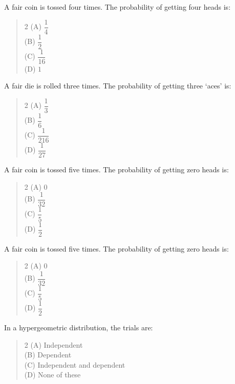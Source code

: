 \documentclass[11pt,a4paper]{article}
\begin{document}
\begin{mcqlist}
\item A fair coin is tossed four times. The probability of getting four heads is:
\begin{quote}\begin{multicols}{2}
\noindent (A) $\dfrac{1}{4}$ \\
(B) $\dfrac{1}{2}$ \\
(C) $\dfrac{1}{16}$ \\
(D) $1$
\end{multicols}\end{quote}

\item A fair die is rolled three times. The probability of getting three `aces' is:
\begin{quote}\begin{multicols}{2}
\noindent (A) $\dfrac{1}{3}$ \\
(B) $\dfrac{1}{6}$ \\
(C) $\dfrac{1}{216}$ \\
(D) $\dfrac{1}{27}$
\end{multicols}\end{quote}

\item A fair coin is tossed five times. The probability of getting zero heads is:
\begin{quote}\begin{multicols}{2}
\noindent (A) $0$ \\
(B) $\dfrac{1}{32}$ \\
(C) $\dfrac{1}{5}$ \\
(D) $\dfrac{1}{2}$
\end{multicols}\end{quote}

\item A fair coin is tossed five times. The probability of getting zero heads is:
\begin{quote}\begin{multicols}{2}
\noindent (A) $0$ \\
(B) $\dfrac{1}{32}$ \\
(C) $\dfrac{1}{5}$ \\
(D) $\dfrac{1}{2}$
\end{multicols}\end{quote}

\item In a hypergeometric distribution, the trials are:
\begin{quote}\begin{multicols}{2}
\noindent (A) Independent \\
(B) Dependent \\
(C) Independent and dependent \\
(D) None of these
\end{multicols}\end{quote}


\end{mcqlist}
\end{document}
